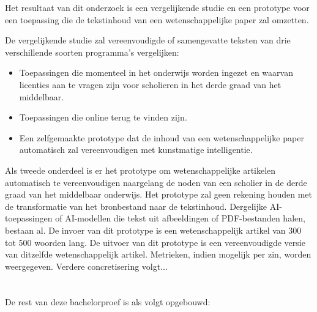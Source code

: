 
Het resultaat van dit onderzoek is een vergelijkende studie en een prototype voor een toepassing die de tekstinhoud van een wetenschappelijke paper zal omzetten.

De vergelijkende studie zal vereenvoudigde of samengevatte teksten van drie verschillende soorten programma's vergelijken:
\begin{itemize}
	\item Toepassingen die momenteel in het onderwijs worden ingezet en waarvan licenties aan te vragen zijn voor scholieren in het derde graad van het middelbaar.
	\item Toepassingen die online terug te vinden zijn.
	\item Een zelfgemaakte prototype dat de inhoud van een wetenschappelijke paper automatisch zal vereenvoudigen met kunstmatige intelligentie.
\end{itemize}

Als tweede onderdeel is er het prototype om wetenschappelijke artikelen automatisch te vereenvoudigen naargelang de noden van een scholier in de derde graad van het middelbaar onderwijs. Het prototype zal geen rekening houden met de transformatie van het bronbestand naar de tekstinhoud. Dergelijke AI-toepassingen of AI-modellen die tekst uit afbeeldingen of PDF-bestanden halen, bestaan al. De invoer van dit prototype is een wetenschappelijk artikel van 300 tot 500 woorden lang. De uitvoer van dit prototype is een vereenvoudigde versie van ditzelfde wetenschappelijk artikel. Metrieken, indien mogelijk per zin, worden weergegeven. Verdere concretisering volgt...

\section{}%
\label{sec:opzet-bachelorproef}


De rest van deze bachelorproef is als volgt opgebouwd:

